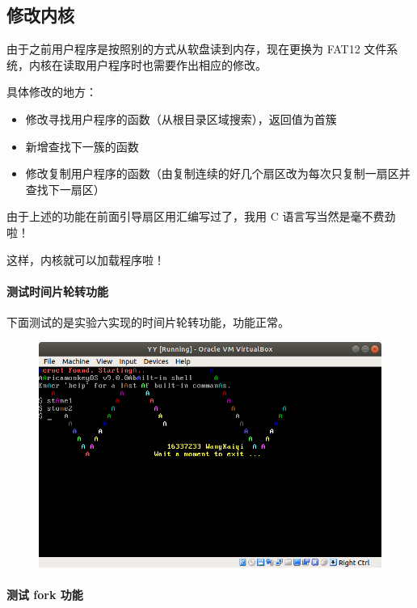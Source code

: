 \documentclass[a4paper]{article}
\begin{document}
\subsection{修改内核}

由于之前用户程序是按照别的方式从软盘读到内存，现在更换为 FAT12 文件系统，内核在读取用户程序时也需要作出相应的修改。

具体修改的地方：

\begin{itemize}
\item 修改寻找用户程序的函数（从根目录区域搜索），返回值为首簇
\item 新增查找下一簇的函数
\item 修改复制用户程序的函数（由复制连续的好几个扇区改为每次只复制一扇区并查找下一扇区）
\end{itemize}

由于上述的功能在前面引导扇区用汇编写过了，我用 C 语言写当然是毫不费劲啦！

这样，内核就可以加载程序啦！

\paragraph{测试时间片轮转功能}

下面测试的是实验六实现的时间片轮转功能，功能正常。

\begin{figure}[!hbp]
\centering
\includegraphics[scale=0.5]{pics/9.png}
\end{figure}

\paragraph{测试 fork 功能}
\end{document}
